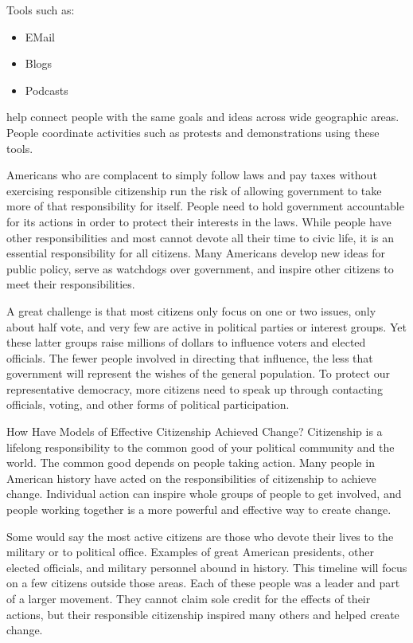 Tools such as:

\begin{itemize}
    \item EMail
    \item Blogs
    \item Podcasts
\end{itemize}

help connect people with the same goals and ideas across wide geographic areas.
People coordinate activities such as protests and demonstrations using these
tools.

Americans who are complacent to simply follow laws and pay taxes without
exercising responsible citizenship run the risk of allowing government to take
more of that responsibility for itself. People need to hold government
accountable for its actions in order to protect their interests in the laws.
While people have other responsibilities and most cannot devote all their time
to civic life, it is an essential responsibility for all citizens. Many
Americans develop new ideas for public policy, serve as watchdogs over
government, and inspire other citizens to meet their responsibilities.

A great challenge is that most citizens only focus on one or two issues, only
about half vote, and very few are active in political parties or interest
groups. Yet these latter groups raise millions of dollars to influence voters
and elected officials. The fewer people involved in directing that influence,
the less that government will represent the wishes of the general population.
To protect our representative democracy, more citizens need to speak up through
contacting officials, voting, and other forms of political participation.

How Have Models of Effective Citizenship Achieved Change?
Citizenship is a lifelong responsibility to the common good of your political
community and the world. The common good depends on people taking action. Many
people in American history have acted on the responsibilities of citizenship to
achieve change. Individual action can inspire whole groups of people to get
involved, and people working together is a more powerful and effective way to
create change.

Some would say the most active citizens are those who devote their lives to the
military or to political office. Examples of great American presidents, other
elected officials, and military personnel abound in history. This timeline will
focus on a few citizens outside those areas. Each of these people was a leader
and part of a larger movement. They cannot claim sole credit for the effects of
their actions, but their responsible citizenship inspired many others and
helped create change.


